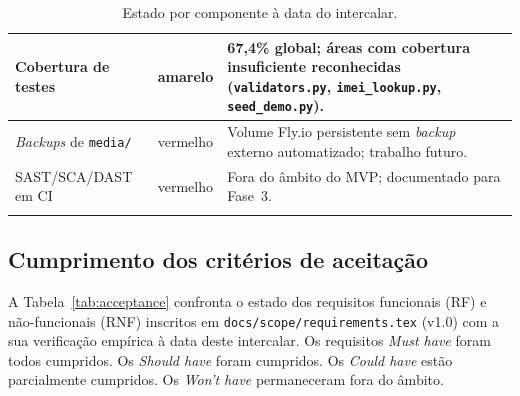 \begin{longtable}{@{}L{4cm}L{2cm}L{8cm}@{}}
\midrule
Cobertura de testes                          & \textcolor{warningorange}{amarelo} & 67{,}4\% global; áreas com cobertura insuficiente reconhecidas (\texttt{validators.py}, \texttt{imei\_lookup.py}, \texttt{seed\_demo.py}). \\
\midrule
\emph{Backups} de \texttt{media/}            & \textcolor{dangerred}{vermelho}    & Volume Fly.io persistente sem \emph{backup} externo automatizado; trabalho futuro. \\
\midrule
SAST/SCA/DAST em CI                          & \textcolor{dangerred}{vermelho}    & Fora do âmbito do MVP; documentado para Fase~3. \\
\bottomrule
\caption{Estado por componente à data do intercalar.}
\label{tab:components}
\end{longtable}

\subsection{Cumprimento dos critérios de aceitação}
\label{sec:acceptance}

A Tabela~\ref{tab:acceptance} confronta o estado dos requisitos
funcionais (RF) e não-funcionais (RNF) inscritos em
\texttt{docs/scope/requirements.tex} (v1.0) com a sua verificação
empírica à data deste intercalar. Os requisitos \emph{Must have}
foram todos cumpridos. Os \emph{Should have} foram cumpridos. Os
\emph{Could have} estão parcialmente cumpridos. Os \emph{Won't have}
permaneceram fora do âmbito.

